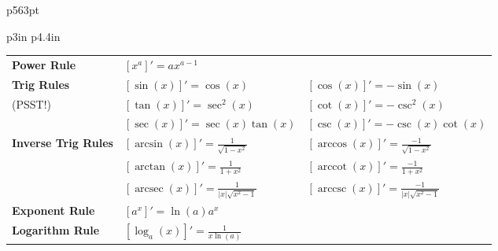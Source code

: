 \documentclass{article}
\newenvironment{bx}[1][]{
\begin{tcolorbox}[colback=white!97!black, title=#1, arc=0in, halign=flush left, left=1mm, right=1mm,]
}{
\end{tcolorbox}
}
\DeclareMathOperator{\arcsec}{arcsec}
\DeclareMathOperator{\arccot}{arccot}
\DeclareMathOperator{\arccsc}{arccsc}
\begin{document}
\begin{center}
\begin{tabular}{p{563pt}}
\begin{bx}[Finding Derivatives]
\begin{tabular}{p{3in} p{4.4in}}
\begin{center}
\def\arraystretch{1.5}
\begin{tabular}{lll}
\toprule[0.4mm]
\textbf{Power Rule}        & $[x^a]' = ax^{a-1}$ \\
\textbf{Trig Rules}  & $[\sin(x)]' = \cos(x)$ & $[\cos(x)]' = -\sin(x)$ \\
(PSST!)& $[\tan(x)]'=\sec^2(x)$ & $[\cot(x)]'=-\csc^2(x)$\\
& $[\sec(x)]'=\sec(x)\tan(x)$ & $[\csc(x)]'=-\csc(x)\cot(x)$ \\
\textbf{Inverse Trig Rules} & $[\arcsin(x)]'=\frac{1}{\sqrt{1-x^2}}$ & $[\arccos(x)]'=\frac{-1}{\sqrt{1-x^2}}$\\
& $[\arctan(x)]'=\frac{1}{1+x^2}$ & $[\arccot(x)]'=\frac{-1}{1+x^2}$\\
& $[\arcsec(x)]'=\frac{1}{|x|\sqrt{x^2-1}}$ &
$[\arccsc(x)]'=\frac{-1}{|x|\sqrt{x^2-1}}$  \\
\textbf{Exponent Rule} & $[a^x]' = \ln(a)a^x$ \\
\textbf{Logarithm Rule} & $[\log_a(x)]' = \frac{1}{x\ln(a)}$ \\
\bottomrule[0.4mm]
\end{tabular}
\end{center}

\end{tabular}


\end{bx}
\end{tabular}


\end{center}

\newpage
\end{document}
